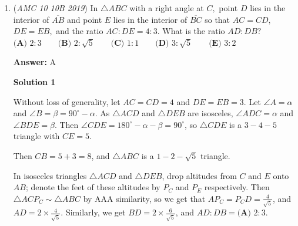 \begin{enumerate}
 
The area of triangle 1 is half of triangle 2 so we can have an equation now:

 
$2a\cdot\sqrt{b^2-a^2}=\sqrt{b^2-a^2}\cdot b$
$2a=b$

 
If the hypotenuse is double the length of the small leg, that means the first triangle is a $30-60-90$ triangle. To find $a$, we can relate it to the area of the first triangle.

 $\frac{a\cdot\sqrt{3}a}{2}=1$
$a\cdot\sqrt{3}a=2$
$a^2=\frac{2}{\sqrt{3}}$

 Now that we have $a^2$ we can find $b^2$ by multiplying $a^2$ by $4$. $b^2=\frac{8}{\sqrt{3}}$.

 We can find the square of the hypotenuse of the second triangle(the third side) if we know $a^2$ and $b^2$.

 $2b^2-a^2=\frac{16}{\sqrt{3}}-\frac{2}{\sqrt{3}}=\frac{14}{\sqrt{3}}$

 
The problem asks us to multiply $a^2$ by the number we just got to get the answer.

 
$\frac{2}{\sqrt{3}}\cdot\frac{14}{\sqrt{3}}=\frac{28}{3}$

 
And we're done(read in Richard Rusczyk voice).

 
-BOTNATE

 


	\item (\textit{AMC 10 10B 2019}) In $\triangle ABC$ with a right angle at $C,$ point $D$ lies in the interior of $\overline{AB}$ and point $E$ lies in the interior of $\overline{BC}$ so that $AC=CD,$ $DE=EB,$ and the ratio $AC:DE=4:3.$ What is the ratio $AD:DB?$
$\textbf{(A) } 2:3 \qquad\textbf{(B) } 2:\sqrt{5} \qquad\textbf{(C) } 1:1 \qquad\textbf{(D) } 3:\sqrt{5} \qquad\textbf{(E) } 3:2$

 \textbf{Answer: }A



\textbf{Solution 1}

Without loss of generality, let $AC = CD = 4$ and $DE = EB = 3$. Let $\angle A = \alpha$ and $\angle B = \beta = 90^{\circ} - \alpha$. As $\triangle ACD$ and $\triangle DEB$ are isosceles, $\angle ADC = \alpha$ and $\angle BDE = \beta$. Then $\angle CDE = 180^{\circ} - \alpha - \beta = 90^{\circ}$, so $\triangle CDE$ is a $3-4-5$ triangle with $CE = 5$.

 Then $CB = 5+3 = 8$, and $\triangle ABC$ is a $1-2-\sqrt{5}$ triangle.

 In isosceles triangles $\triangle ACD$ and $\triangle DEB$, drop altitudes from $C$ and $E$ onto $AB$; denote the feet of these altitudes by $P_C$ and $P_E$ respectively. Then $\triangle ACP_C \sim \triangle ABC$ by AAA similarity, so we get that $AP_C = P_CD = \frac{4}{\sqrt{5}}$, and $AD = 2 \times \frac{4}{\sqrt{5}}$. Similarly, we get $BD = 2 \times \frac{6}{\sqrt{5}}$, and $AD:DB = \boxed{\textbf{(A) } 2:3}$.


\end{enumerate}

